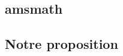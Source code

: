 \documentclass[varwidth, border=3pt]{standalone}
\begin{document}
\subsection*{amsmath}

\test{\pmod}{\pod}

\subsection*{Notre proposition}

\test{\brmod}{\brod}
\end{document}
